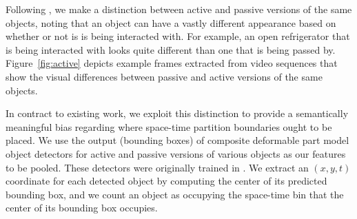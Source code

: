 \documentclass[12pt]{article} %
\begin{document}
  Following \cite{Ramanan12}, we make a distinction between active and passive
  versions of the same objects, noting that an object can have a vastly different
  appearance based on whether or not is is being interacted with. For example, an
  open refrigerator that is being interacted with looks quite different than one
  that is being passed by. Figure~\ref{fig:active} depicts example frames extracted from
  video sequences that show the visual differences between passive and
  active versions of the same objects.

  In contract to existing work, we exploit this distinction to provide a
  semantically meaningful bias regarding where space-time partition boundaries
  ought to be placed. We use the output (bounding boxes) of composite deformable part model 
  object detectors for active and passive versions of various objects as our features to be 
  pooled.
  These detectors were originally trained in \cite{Ramanan12}.
  We extract an $(x,y,t)$ coordinate for each detected object
  by computing the center of its predicted bounding box, and we count an object as occupying 
  the space-time bin that the center of its bounding box occupies.
\end{document}
